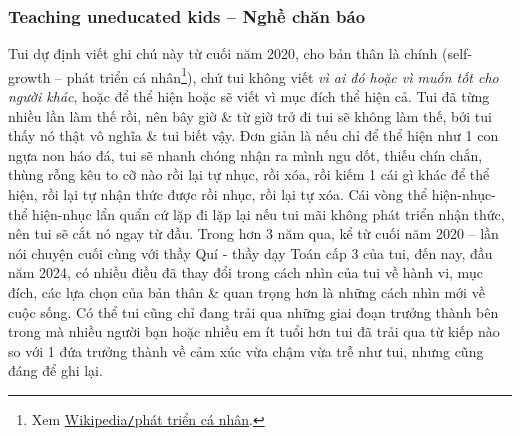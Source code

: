 \documentclass[12pt]{article}
\begin{document}
\subsubsection{Teaching uneducated kids -- Nghề chăn báo}
Tui dự định viết ghi chú này từ cuối năm 2020, cho bản thân là chính (self-growth -- phát triển cá nhân\footnote{Xem \href{https://vi.wikipedia.org/wiki/Phat_trien_ca_nhan}{Wikipedia{\tt/}phát triển cá nhân}.}), chứ tui không viết {\it vì ai đó hoặc vì muốn tốt cho người khác}, hoặc để thể hiện hoặc sẽ viết vì mục đích thể hiện cả. Tui đã từng nhiều lần làm thế rồi, nên bây giờ \& từ giờ trở đi tui sẽ không làm thế, bởi tui thấy nó thật vô nghĩa \& tui biết vậy. Đơn giản là nếu chỉ để thể hiện như 1 con ngựa non háo đá, tui sẽ nhanh chóng nhận ra mình ngu dốt, thiếu chín chắn, thùng rỗng kêu to cỡ nào rồi lại tự nhục, rồi xóa, rồi kiếm 1 cái gì khác để thể hiện, rồi lại tự nhận thức được rồi nhục, rồi lại tự xóa. Cái vòng thể hiện-nhục-thể hiện-nhục lẩn quẩn cứ lặp đi lặp lại nếu tui mãi không phát triển nhận thức, nên tui sẽ cắt nó ngay từ đầu. Trong hơn 3 năm qua, kể từ cuối năm 2020 -- lần nói chuyện cuối cùng với thầy Quí - thầy dạy Toán cấp 3 của tui, đến nay, đầu năm 2024, có nhiều điều đã thay đổi trong cách nhìn của tui về hành vi, mục đích, các lựa chọn của bản thân \& quan trọng hơn là những cách nhìn mới về cuộc sống. Có thể tui cũng chỉ đang trải qua những giai đoạn trưởng thành bên trong mà nhiều người bạn hoặc nhiều em ít tuổi hơn tui đã trải qua từ kiếp nào so với 1 đứa trưởng thành về cảm xúc vừa chậm vừa trễ như tui, nhưng cũng đáng để ghi lại.
\end{document}

